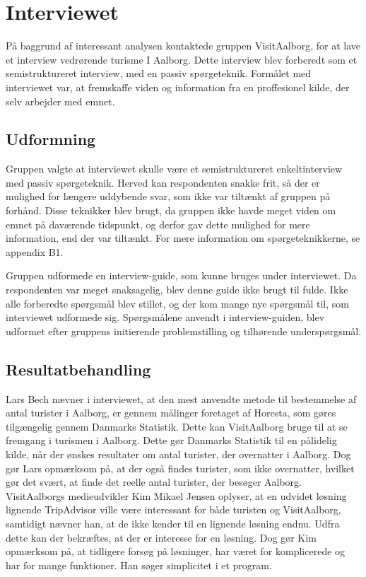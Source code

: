 \section{Interviewet}
På baggrund af interessant analysen kontaktede gruppen VisitAalborg, for at lave et interview vedrørende turisme I Aalborg. Dette interview blev forberedt som et semistruktureret interview, med en passiv spørgeteknik. Formålet med interviewet var, at fremskaffe viden og information fra en proffesionel kilde, der selv arbejder med emnet.
 
\subsection{Udformning}
Gruppen valgte at interviewet skulle være et semistruktureret enkeltinterview med passiv spørgeteknik. Herved kan respondenten snakke frit, så der er mulighed for længere uddybende svar, som ikke var tiltænkt af gruppen på forhånd. Disse teknikker blev brugt, da gruppen ikke havde meget viden om emnet på daværende tidspunkt, og derfor gav dette mulighed for mere information, end der var tiltænkt. For mere information om spørgeteknikkerne, se appendix B1.

Gruppen udformede en interview-guide, som kunne bruges under interviewet. Da respondenten var meget snaksagelig, blev denne guide ikke brugt til fulde. Ikke alle forberedte spørgsmål blev stillet, og der kom mange nye spørgsmål til, som interviewet udformede sig.  Spørgsmålene anvendt i interview-guiden, blev udformet efter gruppens initierende problemstilling og tilhørende underspørgsmål.
\subsection{Resultatbehandling}
Lars Bech nævner i interviewet, at den mest anvendte metode til bestemmelse af antal turister i Aalborg, er gennem målinger foretaget af Horesta, som gøres tilgængelig gennem Danmarks Statistik. Dette kan VisitAalborg bruge til at se fremgang i turismen i Aalborg. Dette gør Danmarks Statistik til en pålidelig kilde, når der ønskes resultater om antal turister, der overnatter i Aalborg. Dog gør Lars opmærksom på, at der også findes turister, som ikke overnatter, hvilket gør det svært, at finde det reelle antal turister, der besøger Aalborg.
VisitAalborgs medieudvikler Kim Mikael Jensen oplyser, at en udvidet løsning lignende TripAdvisor ville være interessant for både turisten og VisitAalborg, samtidigt nævner han, at de ikke kender til en lignende løsning endnu. Udfra dette kan der bekræftes, at der er interesse for en løsning. Dog gør Kim opmærksom på, at tidligere forsøg på løsninger, har været for komplicerede og har for mange funktioner. Han søger simplicitet i et program.

